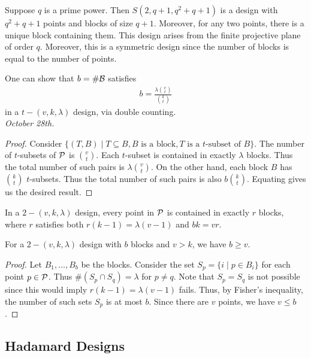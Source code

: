 \begin{example}
    Suppose $q$ is a prime power. Then $S(2,q+1,q^{2}+q+1)$ is a design with $q^{2}+q+1$ points and blocks of size $q+1$. Moreover, for any two points, there is a unique block containing them. This design arises from the finite projective plane of order $q$. Moreover, this is a symmetric design since the number of blocks is equal to the number of points.
\end{example}

One can show that $b = \# \mathcal{B}$ satisfies
\begin{align}
    b = \frac{\lambda \binom{v}{t}}{\binom{k}{t}}
\end{align}
in a $t-(v,k,\lambda)$ design, via double counting.\\

\textit{October 28th.}
\begin{proof}
    Consider $\{(T,B) \mid T \subseteq B, B \text{ is a block}, T \text{ is a } t\text{-subset of } B\}$. The number of $t$-subsets of $\mathcal{P}$ is $\binom{v}{t}$. Each $t$-subset is contained in exactly $\lambda$ blocks. Thus the total number of such pairs is $\lambda \binom{v}{t}$. On the other hand, each block $B$ has $\binom{k}{t}$ $t$-subsets. Thus the total number of such pairs is also $b \binom{k}{t}$. Equating gives us the desired result.
\end{proof}


\begin{lemma}
    In a $2-(v,k,\lambda)$ design, every point in $\mathcal{P}$ is contained in exactly $r$ blocks, where $r$ satisfies both $r(k-1) = \lambda (v-1)$ and $bk = vr$.    
\end{lemma}

\begin{theorem}
    For a $2-(v,k,\lambda)$ design with $b$ blocks and $v > k$, we have $b \geq v$.
\end{theorem}

\begin{proof}
    Let $B_{1},\ldots,B_{b}$ be the blocks. Consider the set $S_{p} = \{i \mid p \in B_{i}\}$ for each point $p \in \mathcal{P}$. Thus $\# (S_{p} \cap S_{q}) = \lambda$ for $p \neq q$. Note that $S_{p} = S_{q}$ is not possible since this would imply $r(k-1) = \lambda (v-1)$ fails. Thus, by Fisher's inequality, the number of such sets $S_{p}$ is at most $b$. Since there are $v$ points, we have $v \leq b$.
\end{proof}

\subsection{Hadamard Designs}

